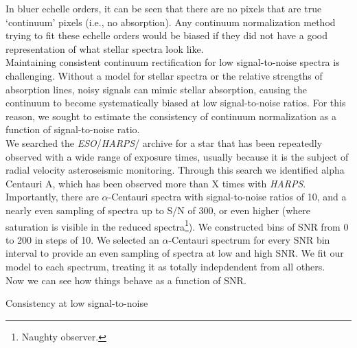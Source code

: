 \documentclass[modern]{aastex631}
\newcommand{\project}[1]{\textit{#1}}
\newcommand{\eso}{\project{ESO}}
\newcommand{\harps}{\project{HARPS}}
\newcommand{\todo}[1]{\textcolor{tab:red}{#1}}
\begin{document}
In bluer echelle orders, it can be seen that there are no pixels that are true `continuum' pixels (i.e., no absorption). Any continuum normalization method trying to fit these echelle orders would be biased if they did not have a good representation of what stellar spectra look like. \\

Maintaining consistent continuum rectification for low signal-to-noise spectra is challenging. Without a model for stellar spectra or the relative strengths of absorption lines, noisy signals can mimic stellar absorption, causing the continuum to become systematically biased at low signal-to-noise ratios. For this reason, we sought to estimate the consistency of continuum normalization as a function of signal-to-noise ratio.\\

We searched the \eso/\harps/ archive for a star that has been repeatedly observed with a wide range of exposure times, usually because it is the subject of radial velocity asteroseismic monitoring. Through this search we identified alpha Centauri A, which has been observed more than \todo{X} times with \harps. Importantly, there are $\alpha$-Centauri spectra with signal-to-noise ratios of 10, and a nearly even sampling of spectra up to S/N of 300, or even higher (where saturation is visible in the reduced spectra\footnote{Naughty observer.}). We constructed bins of SNR from 0 to 200 in steps of 10. We selected an $\alpha$-Centauri spectrum for every SNR bin interval to provide an even sampling of spectra at low and high SNR. We fit our model to each spectrum, treating it as totally indepdendent from all others.\\

\todo{Now we can see how things behave as a function of SNR.}

\todo{Consistency at low signal-to-noise}


\end{document}
